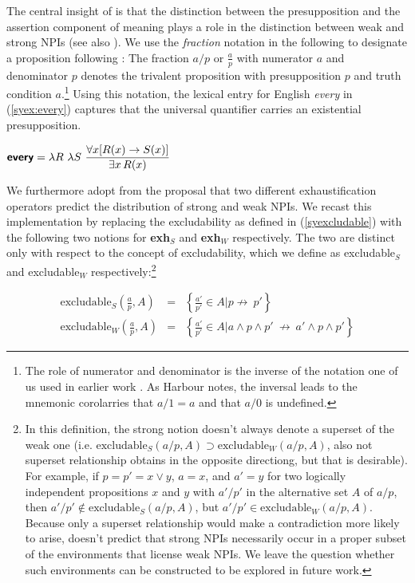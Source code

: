 \documentclass[output=paper,colorlinks,citecolor=brown,
]{langscibook}
\let\l\lambda
\def\existsx{\ifmmode\mathop{\exists x}\else$\exists x$\xspace\fi}
\def\forallx{\ifmmode\mathop{\forall x}\else$\forall x$\xspace\fi}
\begin{document}
The central insight of \cite{gajewski11a} is that the distinction between the presupposition and the assertion component of meaning plays a role in the distinction between weak and strong NPIs (see also \citealt{homer08h}).
We use the \emph{fraction} notation in the following to designate a proposition  following \cite{harbour14a}: The fraction $a/p$ or $\scriptstyle\frac{a}{p}$ with numerator $a$ and denominator $p$ denotes the trivalent proposition with presupposition $p$ and truth condition $a$.\footnote{The role of numerator and denominator is the inverse of the notation one of us used in earlier work \citep{sauerland05f}. As Harbour notes, the inversal leads to the mnemonic corolarries that $a/1 = a$ and that $a/0$ is undefined.} Using this notation, the lexical entry for English \emph{every} in (\ref{syex:every}) captures that the universal quantifier carries an existential presupposition.

\ea \label{syex:every}
$\displaystyle \textsb{every} = \l R\ \l S\ \frac{\forallx [R(x) \rightarrow S(x)]}{\existsx R(x)}$\z

We furthermore adopt from \cite{chierchia13a} the proposal that two different exhaustification operators predict the distribution of strong and weak NPIs.
We recast this implementation by replacing the excludability as defined in (\ref{syexcludable}) with the following two notions for \textbf{exh}$_{S}$ and \textbf{exh}$_W$ respectively.
The two are distinct only with respect to the concept of excludability, which we define as excludable$_S$ and excludable$_W$ respectively:\footnote{In this definition, the strong notion doesn't always denote a superset of the weak one (i.e. $\text{excludable}_S(a/p,A) \supset \text{excludable}_W(a/p,A)$, also not superset relationship obtains in the opposite directiong, but that is desirable). For example, if $p = p' = x \lor y$, $a = x$, and $a' = y$ for two logically independent propositions $x$ and $y$ with $a'/p'$ in the alternative set $A$ of $a/p$,  then
$a'/p' \not\in \text{excludable}_S(a/p,A)$, but  $a'/p' \in \text{excludable}_W(a/p,A)$. Because only a superset relationship would make a contradiction more likely to arise, \cite{chierchia13a} doesn't predict that strong NPIs necessarily occur in a proper subset of the environments that license weak NPIs. 
We leave the question whether such environments can be constructed to be explored in future work.}

\begin{eqnarray*}
\text{excludable}_S\left(\frac{a}{p},A\right) &=& \left\{\frac{a'}{p'} \in A \mathrel{\Big|}  p  \not\rightarrow\ p'\right\}\\[1ex]
\text{excludable}_W\left(\frac{a}{p},A\right) &=& \left\{\frac{a'}{p'} \in A \mathrel{\Big|}  a \land p \land p' \  \not\rightarrow\ a' \land p \land p'\right\}
\end{eqnarray*}
\end{document}
